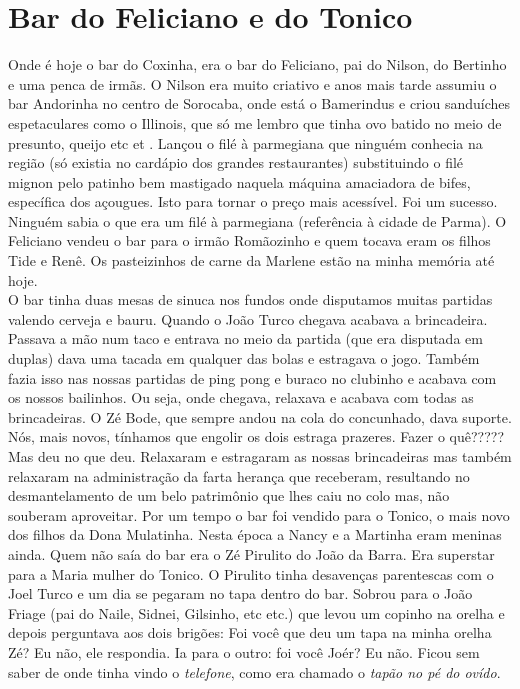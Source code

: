 \documentclass[12pt,brazil,]{book}
\begin{document}
\section{Bar do Feliciano e do
Tonico}\label{bar-do-feliciano-e-do-tonico}

Onde é hoje o bar do Coxinha, era o bar do Feliciano, pai do Nilson, do
Bertinho e uma penca de irmãs. O Nilson era muito criativo e anos mais
tarde assumiu o bar Andorinha no centro de Sorocaba, onde está o
Bamerindus e criou sanduíches espetaculares como o Illinois, que só me
lembro que tinha ovo batido no meio de presunto, queijo etc et . Lançou
o filé à parmegiana que ninguém conhecia na região (só existia no
cardápio dos grandes restaurantes) substituindo o filé mignon pelo
patinho bem mastigado naquela máquina amaciadora de bifes, específica
dos açougues. Isto para tornar o preço mais acessível. Foi um sucesso.
Ninguém sabia o que era um filé à parmegiana (referência à cidade de
Parma). O Feliciano vendeu o bar para o irmão Romãozinho e quem tocava
eram os filhos Tide e Renê. Os pasteizinhos de carne da Marlene estão na
minha memória até hoje.\\
O bar tinha duas mesas de sinuca nos fundos onde disputamos muitas
partidas valendo cerveja e bauru. Quando o João Turco chegava acabava a
brincadeira. Passava a mão num taco e entrava no meio da partida (que
era disputada em duplas) dava uma tacada em qualquer das bolas e
estragava o jogo. Também fazia isso nas nossas partidas de ping pong e
buraco no clubinho e acabava com os nossos bailinhos. Ou seja, onde
chegava, relaxava e acabava com todas as brincadeiras. O Zé Bode, que
sempre andou na cola do concunhado, dava suporte. Nós, mais novos,
tínhamos que engolir os dois estraga prazeres. Fazer o quê????? Mas deu
no que deu. Relaxaram e estragaram as nossas brincadeiras mas também
relaxaram na administração da farta herança que receberam, resultando no
desmantelamento de um belo patrimônio que lhes caiu no colo mas, não
souberam aproveitar. Por um tempo o bar foi vendido para o Tonico, o
mais novo dos filhos da Dona Mulatinha. Nesta época a Nancy e a Martinha
eram meninas ainda. Quem não saía do bar era o Zé Pirulito do João da
Barra. Era superstar para a Maria mulher do Tonico. O Pirulito tinha
desavenças parentescas com o Joel Turco e um dia se pegaram no tapa
dentro do bar. Sobrou para o João Friage (pai do Naile, Sidnei,
Gilsinho, etc etc.) que levou um copinho na orelha e depois perguntava
aos dois brigões: Foi você que deu um tapa na minha orelha Zé? Eu não,
ele respondia. Ia para o outro: foi você Joér? Eu não. Ficou sem saber
de onde tinha vindo o \emph{telefone}, como era chamado o \emph{tapão no
pé do ovído}.
\end{document}
